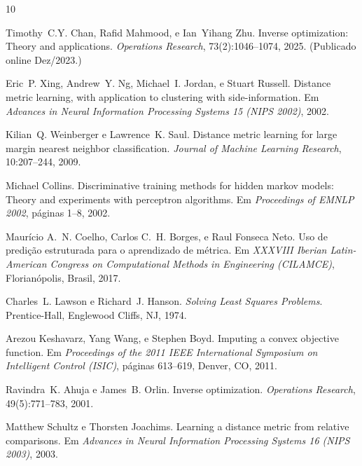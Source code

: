 \documentclass[12pt,a4paper]{article}
\begin{document}

\begin{thebibliography}{10}

Timothy~C.Y. Chan, Rafid Mahmood, e Ian~Yihang Zhu.
\newblock Inverse optimization: Theory and applications.
\newblock \emph{Operations Research}, 73(2):1046--1074, 2025.
\newblock (Publicado online Dez/2023.)

Eric~P. Xing, Andrew~Y. Ng, Michael~I. Jordan, e Stuart Russell.
\newblock Distance metric learning, with application to clustering with
  side-information.
\newblock Em \emph{Advances in Neural Information Processing Systems 15 (NIPS
  2002)}, 2002.

Kilian~Q. Weinberger e Lawrence~K. Saul.
\newblock Distance metric learning for large margin nearest neighbor
  classification.
\newblock \emph{Journal of Machine Learning Research}, 10:207--244, 2009.

Michael Collins.
\newblock Discriminative training methods for hidden markov models: Theory and
  experiments with perceptron algorithms.
\newblock Em \emph{Proceedings of EMNLP 2002}, páginas 1--8, 2002.

Maurício A.~N. Coelho, Carlos C.~H. Borges, e Raul Fonseca Neto.
\newblock Uso de predição estruturada para o aprendizado de métrica.
\newblock Em \emph{XXXVIII Iberian Latin-American Congress on Computational Methods
  in Engineering (CILAMCE)}, Florianópolis, Brasil, 2017.

Charles~L. Lawson e Richard~J. Hanson.
\newblock \emph{Solving Least Squares Problems}.
\newblock Prentice-Hall, Englewood Cliffs, NJ, 1974.

Arezou Keshavarz, Yang Wang, e Stephen Boyd.
\newblock Imputing a convex objective function.
\newblock Em \emph{Proceedings of the 2011 IEEE International Symposium on
  Intelligent Control (ISIC)}, páginas 613--619, Denver, CO, 2011.

Ravindra~K. Ahuja e James~B. Orlin.
\newblock Inverse optimization.
\newblock \emph{Operations Research}, 49(5):771--783, 2001.

Matthew Schultz e Thorsten Joachims.
\newblock Learning a distance metric from relative comparisons.
\newblock Em \emph{Advances in Neural Information Processing Systems 16 (NIPS
  2003)}, 2003.


\end{thebibliography}
\end{document}
